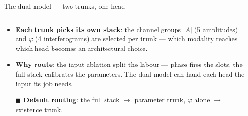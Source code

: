\begin{frame}{The dual model --- two trunks, one head}
\begin{columns}[c]
\begin{column}{0.43\textwidth}
\begin{itemize}
              head the other. Gate blend and Hungarian matching stay as they are.
        \item \textbf{Each trunk picks its own stack}: the channel groups $|A|$
              (5 amplitudes) and $\varphi$ (4 interferograms) are selected
              per trunk --- which modality reaches which head becomes an
              architectural choice.
        \item \textbf{Why route}: the input ablation split the labour --- phase
              fires the slots, the full stack calibrates the parameters. The
              dual model can hand each head the input its job needs.
        \item[\textcolor{accent}{$\blacksquare$}] \textbf{Default routing}: the
              full stack $\to$ parameter trunk, $\varphi$ alone $\to$ existence
              trunk.
      \end{itemize}
    \end{column}
  \end{columns}
\end{frame}

